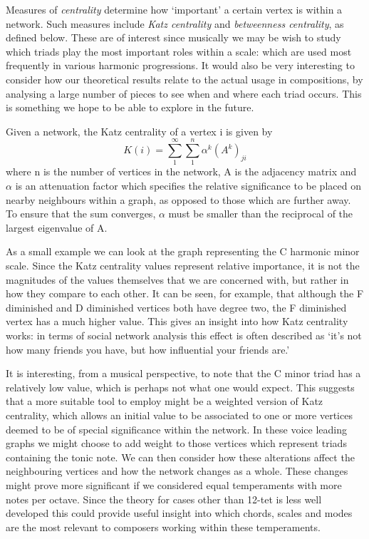 \documentclass[]{tMAM2e}
\begin{document}
Measures of \textit{centrality} determine how `important' a certain vertex is within a network. Such measures include \textit{Katz centrality} and \textit{betweenness centrality}, as defined below. These are of interest since musically we may be wish to study which triads play the most important roles within a scale: which are used most frequently in various harmonic progressions. It would also be very interesting to consider how our theoretical results relate to the actual usage in compositions, by analysing a large number of pieces to see when and where each triad occurs. This is something we hope to be able to explore in the future.

\begin{definition}
Given a network, the Katz centrality of a vertex i is given by $$K(i)=\sum_1^\infty \sum_1^n \alpha^k (A^k)_{ji}$$
where n is the number of vertices in the network, A is the adjacency matrix and $\alpha$ is an attenuation factor which specifies the relative significance to be placed on nearby neighbours within a graph, as opposed to those which are further away. To ensure that the sum converges, $\alpha$ must be smaller than the reciprocal of the largest eigenvalue of A.
\end{definition}


As a small example we can look at the graph representing the C harmonic minor scale. Since the Katz centrality values represent relative importance, it is not the magnitudes of the values themselves that we are concerned with, but rather in how they compare to each other. It can be seen, for example, that although the F diminished and D diminished vertices both have degree two, the F diminished vertex has a much higher value. This gives an insight into how Katz centrality works: in terms of social network analysis this effect is often described as `it's not how many friends you have, but how influential your friends are.'


It is interesting, from a musical perspective, to note that the C minor triad has a relatively low value, which is perhaps not what one would expect. This suggests that a more suitable tool to employ might be a weighted version of Katz centrality, which allows an initial value to be associated to one or more vertices deemed to be of special significance within the network. In these voice leading graphs we might choose to add weight to those vertices which represent triads containing the tonic note. We can then consider how these alterations affect the neighbouring vertices and how the network changes as a whole. These changes might prove more significant if we considered equal temperaments with more notes per octave. Since the theory for cases other than 12-tet is less well developed this could provide useful insight into which chords, scales and modes are the most relevant to composers working within these temperaments. 
\end{document}
